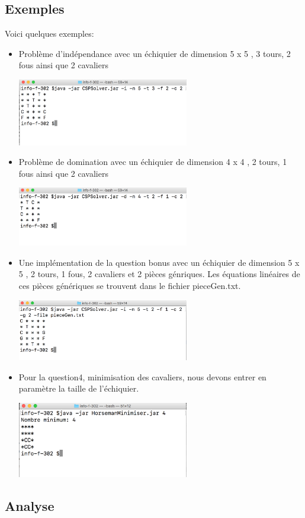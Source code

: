 \documentclass{article}
\begin{document}
\subsection{Exemples}
Voici quelques exemples:
\begin{itemize}
\item Problème d'indépendance avec un échiquier de dimension 5 x 5 , 3 tours, 2 fous ainsi que 2 cavaliers
 	\begin{center}
 		 	 \includegraphics[width=75mm,scale=0.8]{./CSPindep.png}
 	\end{center}
\item Problème de domination avec un échiquier de dimension 4 x 4 , 2 tours, 1 fous ainsi que 2 cavaliers
 	\begin{center}
 		 	 \includegraphics[width=75mm,scale=0.8]{./CSPdep.png}
 	\end{center}
\item Une implémentation de la question bonus avec un échiquier de dimension 5 x 5 , 2 tours, 1 fous, 2 cavaliers et 2 pièces génriques. Les équations linéaires de ces pièces génériques se trouvent dans le fichier pieceGen.txt.
 	\begin{center}
 		 	 \includegraphics[width=75mm,scale=0.8]{./CSPgen.png}
 	\end{center}
\item Pour la question4, minimisation des cavaliers, nous devons entrer en paramètre la taille de l'échiquier.
 	\begin{center}
 		 	 \includegraphics[width=75mm,scale=0.8]{./Horsemin.png}
 	\end{center}
\end{itemize}


\subsection{Analyse}
\end{document}
